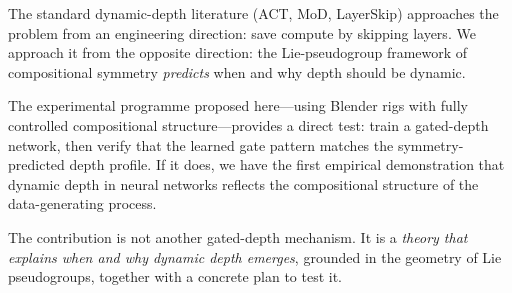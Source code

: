 \documentclass[11pt,a4paper]{article}
\begin{document}
The standard dynamic-depth literature (ACT, MoD, LayerSkip)
approaches the problem from an engineering direction:
save compute by skipping layers.
We approach it from the opposite direction:
the Lie-pseudogroup framework of compositional symmetry
\emph{predicts} when and why depth should be dynamic.

The experimental programme proposed here---using Blender rigs
with fully controlled compositional structure---provides a
direct test: train a gated-depth network, then verify that
the learned gate pattern matches the symmetry-predicted
depth profile.
If it does, we have the first empirical demonstration that
dynamic depth in neural networks reflects the compositional
structure of the data-generating process.

The contribution is not another gated-depth mechanism.
It is a \emph{theory that explains when and why dynamic depth
emerges}, grounded in the geometry of Lie pseudogroups,
together with a concrete plan to test it.
\end{document}
